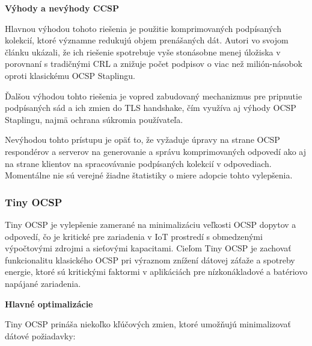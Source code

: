 \documentclass[12pt, twoside]{book}
\newcommand{\subsubsubsection}[1]{%
  \vspace{0.2em}  
  \textbf{#1} \\[0.2em]
  \hspace*{\parindent}
}
\begin{document}
\subsubsubsection{Výhody a nevýhody CCSP}
Hlavnou výhodou tohoto riešenia je použitie komprimovaných podpísaných kolekcií, ktoré významne redukujú objem prenášaných dát. Autori vo svojom článku ukázali, že     ich riešenie spotrebuje vyše stonásobne menej úložiska v porovnaní s tradičnými CRL a znižuje počet podpisov o viac než milión-násobok oproti klasickému OCSP Staplingu. 

Ďalšou výhodou tohto riešenia je vopred zabudovaný mechanizmus pre pripnutie podpísaných sád a ich zmien do TLS handshake, čím využíva aj výhody OCSP Staplingu, najmä ochrana súkromia používateľa.

Nevýhodou tohto prístupu je opäť to, že vyžaduje úpravy na strane OCSP respondérov a serverov na generovanie a správu komprimovaných odpovedí ako aj na strane klientov na spracovávanie podpísaných kolekcií v odpovediach. Momentálne nie sú verejné žiadne štatistiky o miere adopcie tohto vylepšenia.

\subsubsection{Tiny OCSP}
Tiny OCSP je vylepšenie zamerané na minimalizáciu veľkosti OCSP dopytov a odpovedí, čo je kritické pre zariadenia v IoT prostredí s obmedzenými výpočtovými zdrojmi a sieťovými kapacitami. Cieľom Tiny OCSP je zachovať funkcionalitu klasického OCSP pri výraznom znížení dátovej záťaže a spotreby energie, ktoré sú kritickými faktormi v aplikáciách pre nízkonákladové a batériovo napájané zariadenia.

\subsubsubsection{Hlavné optimalizácie}
Tiny OCSP prináša niekoľko kľúčových zmien, ktoré umožňujú minimalizovať dátové požiadavky:
\end{document}

